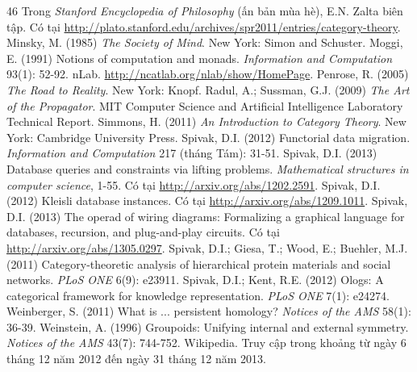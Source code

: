 \begin{thebibliography}{46}
Trong \emph{Stanford Encyclopedia of Philosophy} (ấn bản mùa hè),
E.N. Zalta biên tập. Có tại
\url{http://plato.stanford.edu/archives/spr2011/entries/category-theory}.
 Minsky, M. (1985) \emph{The Society of Mind}.
New York: Simon and Schuster.
 Moggi, E. (1991) Notions of computation and monads.
\emph{Information and Computation} 93(1): 52-92.
 nLab. \url{http://ncatlab.org/nlab/show/HomePage}.
 Penrose, R. (2005) \emph{The Road to Reality}.
New York: Knopf.
 Radul, A.; Sussman, G.J. (2009) \emph{The Art of the Propagator}.
MIT Computer Science and Artificial Intelligence Laboratory Technical Report.
 Simmons, H. (2011) \emph{An Introduction to Category Theory}.
New York: Cambridge University Press.
 Spivak, D.I. (2012) Functorial data migration.
\emph{Information and Computation} 217 (tháng Tám): 31-51.
 Spivak, D.I. (2013) Database queries and constraints via lifting
problems. \emph{Mathematical structures in computer science}, 1-55.
Có tại \url{http://arxiv.org/abs/1202.2591}.
 Spivak, D.I. (2012) Kleisli database instances.
Có tại \url{http://arxiv.org/abs/1209.1011}.
 Spivak, D.I. (2013) The operad of wiring diagrams: Formalizing
a graphical language for databases, recursion, and plug-and-play circuits.
Có tại \url{http://arxiv.org/abs/1305.0297}.
 Spivak, D.I.; Giesa, T.; Wood, E.; Buehler, M.J. (2011)
Category-theoretic analysis of hierarchical protein materials and social networks.
\emph{PLoS ONE} 6(9): e23911.
 Spivak, D.I.; Kent, R.E. (2012)
Ologs: A categorical framework for knowledge representation.
\emph{PLoS ONE} 7(1): e24274.
 Weinberger, S. (2011) What is ... persistent homology?
\emph{Notices of the AMS} 58(1): 36-39.
 Weinstein, A. (1996) Groupoids: Unifying internal and external
symmetry. \emph{Notices of the AMS} 43(7): 744-752.
 Wikipedia. Truy cập trong khoảng từ ngày 6 tháng 12 năm 2012
đến ngày 31 tháng 12 năm 2013.
\end{thebibliography}
